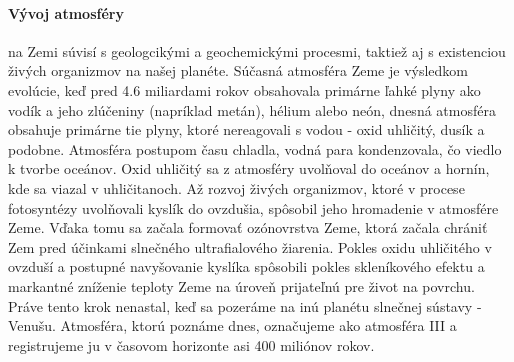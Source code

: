 \paragraph{Vývoj atmosféry} na Zemi súvisí s geologcikými a geochemickými procesmi, taktiež aj s existenciou živých organizmov na našej planéte. Súčasná atmosféra Zeme je výsledkom evolúcie, keď pred 4.6 miliardami rokov obsahovala primárne ľahké plyny ako vodík a jeho zlúčeniny (napríklad metán), hélium alebo neón, dnesná atmosféra obsahuje primárne tie plyny, ktoré nereagovali s vodou - oxid uhličitý, dusík a podobne. Atmosféra postupom času chladla, vodná para kondenzovala, čo viedlo k tvorbe oceánov. Oxid uhličitý sa z atmosféry uvolňoval do oceánov a hornín, kde sa viazal v uhličitanoch. Až rozvoj živých organizmov, ktoré v procese fotosyntézy uvolňovali kyslík do ovzdušia, spôsobil jeho hromadenie v atmosfére Zeme. Vďaka tomu sa začala formovať ozónovrstva Zeme, ktorá začala chrániť Zem pred účinkami slnečného ultrafialového žiarenia. Pokles oxidu uhličitého v ovzduší a postupné navyšovanie kyslíka spôsobili pokles skleníkového efektu a markantné zníženie teploty Zeme na úroveň prijateľnú pre život na povrchu. Práve tento krok nenastal, keď sa pozeráme na inú planétu slnečnej sústavy - Venušu. Atmosféra, ktorú poznáme dnes, označujeme ako atmosféra III a registrujeme ju v časovom horizonte asi 400 miliónov rokov. 
